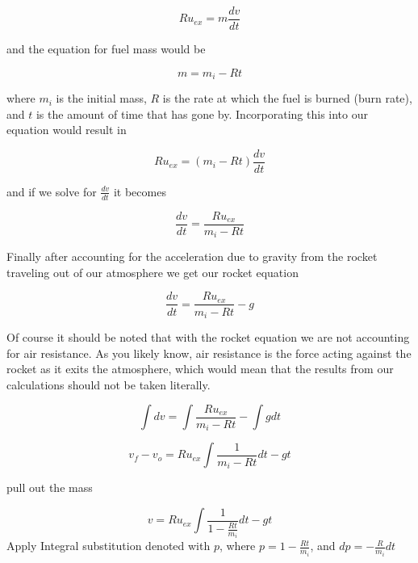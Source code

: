 \documentclass[11pt]{article}
\begin{document}
\begin{equation}
Ru_{ex} = m \frac{dv}{dt}
\end{equation}

\noindent and the equation for fuel mass would be 

\begin{equation}
m = m_i - Rt
\end{equation}

\noindent where $m_i$ is the initial mass, $R$ is the rate at which the fuel is burned (burn rate), and $t$ is the amount of time that has gone by. Incorporating this into our equation would result in

\begin{equation}
Ru_{ex} = (m_i - Rt) \frac{dv}{dt}
\end{equation}

\noindent and if we solve for $\frac{dv}{dt}$ it becomes

\begin{equation}
\frac{dv}{dt} = \frac{Ru_{ex}}{m_i - Rt}
\end{equation} 

Finally after accounting for the acceleration due to gravity from the rocket traveling out of our atmosphere we get our rocket equation

\begin{equation}\label{eq:rocketeq}
\frac{dv}{dt} = \frac{Ru_{ex}}{m_i-Rt}-g
\end{equation}

Of course it should be noted that with the rocket equation we are not accounting for air resistance. As you likely know, air resistance is the force acting against the rocket as it exits the atmosphere, which would mean that the results from our calculations should not be taken literally.

\begin{equation}
\int{dv} = \int{\frac{Ru_{ex}}{m_i-Rt}} - \int{g dt}
\end{equation}

\begin{equation}
v_f-v_o = Ru_{ex}\int{\frac{1}{m_i-Rt}}dt - gt
\end{equation}

pull out the mass

\begin{equation}
v = Ru_{ex}\int{\frac{1}{1-\frac{Rt}{m_i}}}dt - gt
\end{equation}
Apply Integral substitution denoted with $p$, where
$p = 1-\frac{Rt}{m_i}$, and
$dp = - \frac{R}{m_i}dt$
\end{document}

